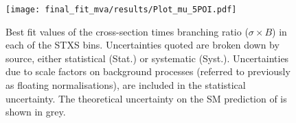 \begin{figure}[hb]
	\centering
	\texttt{[image: final\_fit\_mva/results/Plot\_mu\_5POI.pdf]}
  \caption{Best fit values of the cross-section times branching ratio ($\sigma
    \times B$) in each of the STXS bins. Uncertainties quoted are broken down by
    source, either statistical (Stat.) or systematic (Syst.). Uncertainties due
    to scale factors on background processes (referred to previously as floating
    normalisations), are included in the statistical uncertainty. The
    theoretical uncertainty on the SM prediction of is shown in grey.}
  \label{fig:5POI-mus}
\end{figure}
